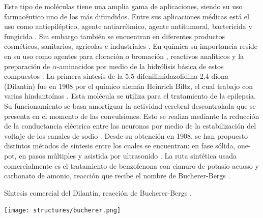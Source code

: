 \documentclass[fleqn,10pt]{SelfArx}
\begin{document}
Este tipo de moléculas tiene una amplia gama de aplicaciones, siendo su uso farmacéutico uno de los más difundidos. Entre sus aplicaciones médicas está el uso como antiepiléptico, agente antiarrítmico, agente antitumoral, bactericida y fungicida \cite{safari2010}\cite{ildiz2012}\cite{hayward1983}. Sin embargo también se encuentran en diferentes productos cosméticos, sanitarios, agrícolas e industriales \cite{kroschwitz2007}. En química su importancia reside en su uso como agentes para cloración o bromación \cite{m2015}, reactivos analíticos \cite{kroschwitz2007} y la preparación de $\alpha$-aminacidos por medio de la hidrólisis básica de estos compuestos \cite{m2015}. La primera síntesis de la 5,5-difenilimidazolidina-2,4-diona (Dilantin) fue en 1908 por el químico alemán Heinrich Biltz, el cual trabajo con varias hindantoínas \cite{hayward1983}\cite{aicardi2007}. Esta molécula se utiliza para el tratamiento de la epilepsia. Su funcionamiento se basa amortiguar la actividad cerebral descontrolada que se presenta en el momento de las convulsiones. Esto se realiza mediante la reducción de la conductancia eléctrica entre las neuronas por medio de la estabilización del voltaje de los canales de sodio \cite{asif2015}. Desde su obtención en 1908, se han propuesto distintos métodos de síntesis entre los cuales se encuentran: en fase sólida, one-pot, en pasos múltiples y asistida por ultrasonido \cite{safari2010}. La ruta sintética usada comercialmente es el tratamiento de benzofenona con cianuro de potasio acuoso y carbonato de amonio, reacci\'on que recibe el nombre de Bucherer-Bergs \cite{hayward1983}\cite{li2013}\cite{kadam2007}. 
\begin{scheme}[h]
	\centering
	\caption{S\'intesis comercial del Dilant\'in, reacci\'on de Bucherer-Bergs \cite{li2013}.}
	\texttt{[image: structures/bucherer.png]}
\end{scheme}
\end{document}
